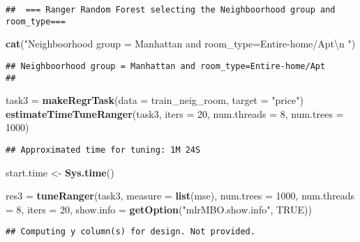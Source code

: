 \documentclass[
]{article}
\newenvironment{Shaded}{\begin{snugshade}}{\end{snugshade}}
\newcommand{\CharTok}[1]{\textcolor[rgb]{0.31,0.60,0.02}{#1}}
\newcommand{\DataTypeTok}[1]{\textcolor[rgb]{0.13,0.29,0.53}{#1}}
\newcommand{\DecValTok}[1]{\textcolor[rgb]{0.00,0.00,0.81}{#1}}
\newcommand{\KeywordTok}[1]{\textcolor[rgb]{0.13,0.29,0.53}{\textbf{#1}}}
\newcommand{\NormalTok}[1]{#1}
\newcommand{\OtherTok}[1]{\textcolor[rgb]{0.56,0.35,0.01}{#1}}
\newcommand{\StringTok}[1]{\textcolor[rgb]{0.31,0.60,0.02}{#1}}
\begin{document}
\begin{verbatim}
##  === Ranger Random Forest selecting the Neighboorhood group and room_type===
\end{verbatim}

\begin{Shaded}
\begin{Highlighting}[]
\KeywordTok{cat}\NormalTok{(}\StringTok{"Neighboorhood group = Manhattan and room_type=Entire-home/Apt}\CharTok{\textbackslash{}n}\StringTok{ "}\NormalTok{)}
\end{Highlighting}
\end{Shaded}

\begin{verbatim}
## Neighboorhood group = Manhattan and room_type=Entire-home/Apt
## 
\end{verbatim}

\begin{Shaded}
\begin{Highlighting}[]
\NormalTok{task3 =}\StringTok{ }\KeywordTok{makeRegrTask}\NormalTok{(}\DataTypeTok{data =}\NormalTok{ train_neig_room, }\DataTypeTok{target =} \StringTok{"price"}\NormalTok{)}
\KeywordTok{estimateTimeTuneRanger}\NormalTok{(task3, }\DataTypeTok{iters =} \DecValTok{20}\NormalTok{, }\DataTypeTok{num.threads =} \DecValTok{8}\NormalTok{, }\DataTypeTok{num.trees =} \DecValTok{1000}\NormalTok{)}
\end{Highlighting}
\end{Shaded}

\begin{verbatim}
## Approximated time for tuning: 1M 24S
\end{verbatim}

\begin{Shaded}
\begin{Highlighting}[]
\NormalTok{start.time <-}\StringTok{ }\KeywordTok{Sys.time}\NormalTok{()}

     
\NormalTok{res3 =}\StringTok{ }\KeywordTok{tuneRanger}\NormalTok{(task3, }\DataTypeTok{measure =} \KeywordTok{list}\NormalTok{(mse), }\DataTypeTok{num.trees =} \DecValTok{1000}\NormalTok{, }
                 \DataTypeTok{num.threads =} \DecValTok{8}\NormalTok{, }\DataTypeTok{iters =} \DecValTok{20}\NormalTok{,  }\DataTypeTok{show.info =} \KeywordTok{getOption}\NormalTok{(}\StringTok{"mlrMBO.show.info"}\NormalTok{, }\OtherTok{TRUE}\NormalTok{))}
\end{Highlighting}
\end{Shaded}

\begin{verbatim}
## Computing y column(s) for design. Not provided.
\end{verbatim}
\end{document}
